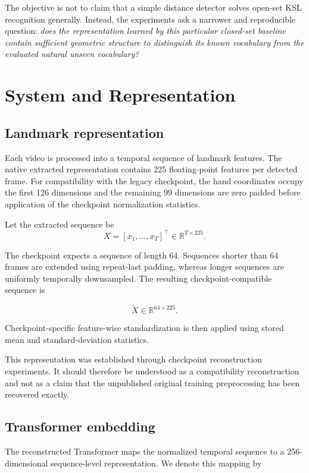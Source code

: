 \documentclass[11pt]{article}
\begin{document}
The objective is not to claim that a simple distance detector
solves open-set KSL recognition generally. Instead, the
experiments ask a narrower and reproducible question:
\emph{does the representation learned by this particular
closed-set baseline contain sufficient geometric structure to
distinguish its known vocabulary from the evaluated natural
unseen vocabulary?}


\section{System and Representation}

\subsection{Landmark representation}

Each video is processed into a temporal sequence of landmark
features. The native extracted representation contains
225 floating-point features per detected frame. For
compatibility with the legacy checkpoint, the hand
coordinates occupy the first 126 dimensions and the remaining
99 dimensions are zero padded before application of the
checkpoint normalization statistics.

Let the extracted sequence be
\[
X =
\left[
x_1,\ldots,x_T
\right]^\top
\in
\mathbb{R}^{T\times225}.
\]

The checkpoint expects a sequence of length 64. Sequences
shorter than 64 frames are extended using repeat-last
padding, whereas longer sequences are uniformly temporally
downsampled. The resulting checkpoint-compatible sequence is

\[
\widetilde{X}
\in
\mathbb{R}^{64\times225}.
\]

Checkpoint-specific feature-wise standardization is then
applied using stored mean and standard-deviation statistics.

This representation was established through checkpoint
reconstruction experiments. It should therefore be understood
as a compatibility reconstruction and not as a claim that the
unpublished original training preprocessing has been recovered
exactly.


\subsection{Transformer embedding}

The reconstructed Transformer maps the normalized temporal
sequence to a 256-dimensional sequence-level representation.
We denote this mapping by
\end{document}

